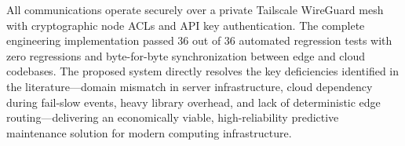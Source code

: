 \documentclass[12pt,a4paper]{report}
\begin{document}
All communications operate securely over a private Tailscale WireGuard mesh with cryptographic node ACLs and API key authentication. The complete engineering implementation passed 36 out of 36 automated regression tests with zero regressions and byte-for-byte synchronization between edge and cloud codebases. The proposed system directly resolves the key deficiencies identified in the literature---domain mismatch in server infrastructure, cloud dependency during fail-slow events, heavy library overhead, and lack of deterministic edge routing---delivering an economically viable, high-reliability predictive maintenance solution for modern computing infrastructure.

\clearpage

\end{document}
